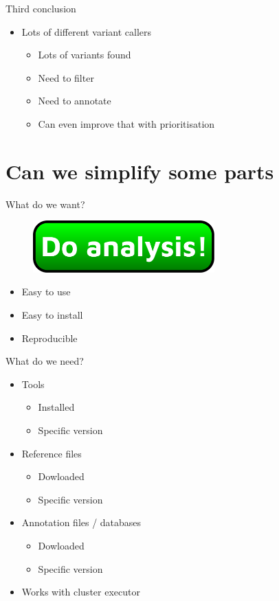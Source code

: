 \documentclass[usepdftitle=false]{beamer}
\begin{document}
\begin{frame}{Third conclusion}
	\begin{itemize}
		\item Lots of different variant callers
		\begin{itemize}
			\item Lots of variants found
			\pause
			\item Need to filter
			\item Need to annotate
			\item Can even improve that with prioritisation
		\end{itemize}
	\end{itemize}
\end{frame}

\section{Can we simplify some parts}

\begin{frame}{What do we want?}
	\begin{figure}
		\includegraphics[height=2cm]{pictures/doanalysis}
	\end{figure}
	\pause
	\begin{itemize}
		\item Easy to use
		\item Easy to install
		\pause
		\item Reproducible
	\end{itemize}
\end{frame}

\begin{frame}{What do we need?}
	\begin{itemize}
		\item Tools
		\pause
		\begin{itemize}
			\item Installed
			\item Specific version
		\end{itemize}
		\pause
		\item Reference files
		\pause
		\begin{itemize}
			\item Dowloaded
			\item Specific version
		\end{itemize}
		\pause
		\item Annotation files / databases
		\pause
		\begin{itemize}
			\item Dowloaded
			\item Specific version
		\end{itemize}
		\pause
		\item Works with cluster executor
	\end{itemize}
\end{frame}
\end{document}
